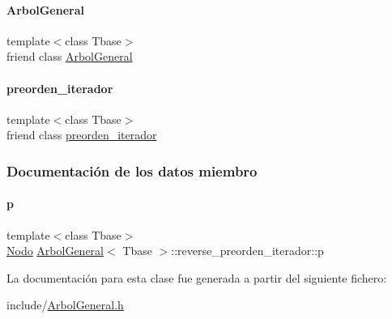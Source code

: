 \paragraph{\texorpdfstring{Arbol\+General}{ArbolGeneral}}
{\footnotesize\ttfamily template$<$class Tbase$>$ \\
friend class \hyperlink{classArbolGeneral}{Arbol\+General}\hspace{0.3cm}{\ttfamily [friend]}}

\hypertarget{classArbolGeneral_1_1reverse__preorden__iterador_a4aa0da8bfbc320a8daff98451ee65b6c}{}\label{classArbolGeneral_1_1reverse__preorden__iterador_a4aa0da8bfbc320a8daff98451ee65b6c} 
\paragraph{\texorpdfstring{preorden\+\_\+iterador}{preorden\_iterador}}
{\footnotesize\ttfamily template$<$class Tbase$>$ \\
friend class \hyperlink{classArbolGeneral_1_1preorden__iterador}{preorden\+\_\+iterador}\hspace{0.3cm}{\ttfamily [friend]}}



\subsubsection{Documentación de los datos miembro}
\hypertarget{classArbolGeneral_1_1reverse__preorden__iterador_a002862fdee453a84b037e5dd26c071a2}{}\label{classArbolGeneral_1_1reverse__preorden__iterador_a002862fdee453a84b037e5dd26c071a2} 
\paragraph{\texorpdfstring{p}{p}}
{\footnotesize\ttfamily template$<$class Tbase$>$ \\
\hyperlink{classArbolGeneral_a12cc1b74a9095d89bc7334290d332f7a}{Nodo} \hyperlink{classArbolGeneral}{Arbol\+General}$<$ Tbase $>$\+::reverse\+\_\+preorden\+\_\+iterador\+::p\hspace{0.3cm}{\ttfamily [private]}}



La documentación para esta clase fue generada a partir del siguiente fichero\+:\begin{DoxyCompactItemize}
\item 
include/\hyperlink{ArbolGeneral_8h}{Arbol\+General.\+h}\end{DoxyCompactItemize}
